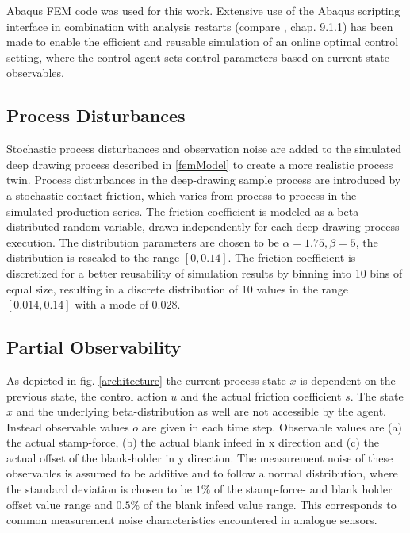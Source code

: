 Abaqus FEM code was used for this work. Extensive use of the Abaqus scripting interface \cite{AbaqusScripting} in combination with analysis restarts (compare \cite{AbaqusAnalysis2}, chap. 9.1.1) has been made to enable the efficient and reusable simulation of an online optimal control setting, where the control agent sets control parameters based on current state observables.

\subsection{Process Disturbances}
\label{disturbances}
Stochastic process disturbances and observation noise are added to the simulated deep drawing process described in \ref{femModel} to create a more realistic process twin. Process disturbances in the deep-drawing sample process are introduced by a stochastic contact friction, which varies from process to process in the simulated production series. The friction coefficient is modeled as a beta-distributed random variable, drawn independently for each deep drawing process execution. The distribution parameters are chosen to be $\alpha=1.75, \beta=5$, the distribution is rescaled to the range $[0, 0.14]$. The friction coefficient is discretized for a better reusability of simulation results by binning into 10 bins of equal size, resulting in a discrete distribution of 10 values in the range $[0.014, 0.14]$ with a mode of $0.028$.

\subsection{Partial Observability}
\label{observables}
As depicted in fig. \ref{architecture} the current process state $x$ is dependent on the previous state, the control action $u$ and the actual friction coefficient $s$. The state $x$ and the underlying beta-distribution as well are not accessible by the agent. Instead observable values $o$ are given in each time step. Observable values are (a) the actual stamp-force, (b) the actual blank infeed in x direction and (c) the actual offset of the blank-holder in y direction. The measurement noise of these observables is assumed to be additive and to follow a normal distribution, where the standard deviation is chosen to be $1\%$ of the stamp-force- and blank holder offset value range and $0.5\%$ of the blank infeed value range. This corresponds to common measurement noise characteristics encountered in analogue sensors.

